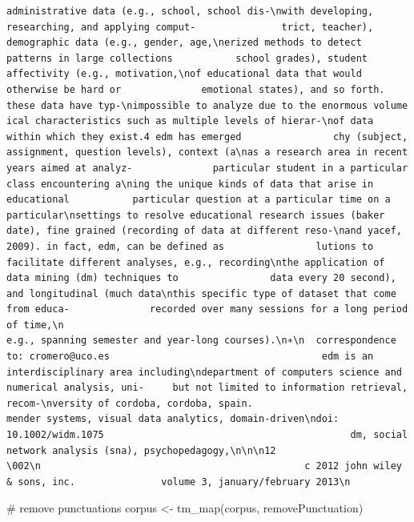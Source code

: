 \documentclass[
]{article}
\newenvironment{Shaded}{}{}
\newcommand{\CommentTok}[1]{\textcolor[rgb]{0.30,0.53,0.42}{#1}}
\newcommand{\FunctionTok}[1]{#1}
\newcommand{\NormalTok}[1]{#1}
\newcommand{\OtherTok}[1]{\textcolor[rgb]{1.00,0.25,0.00}{#1}}
\begin{document}
\begin{verbatim}
administrative data (e.g., school, school dis-\nwith developing, researching, and applying comput-               trict, teacher), demographic data (e.g., gender, age,\nerized methods to detect patterns in large collections           school grades), student affectivity (e.g., motivation,\nof educational data that would otherwise be hard or              emotional states), and so forth. these data have typ-\nimpossible to analyze due to the enormous volume                 ical characteristics such as multiple levels of hierar-\nof data within which they exist.4 edm has emerged                chy (subject, assignment, question levels), context (a\nas a research area in recent years aimed at analyz-              particular student in a particular class encountering a\ning the unique kinds of data that arise in educational           particular question at a particular time on a particular\nsettings to resolve educational research issues (baker           date), fine grained (recording of data at different reso-\nand yacef, 2009). in fact, edm, can be defined as                lutions to facilitate different analyses, e.g., recording\nthe application of data mining (dm) techniques to                data every 20 second), and longitudinal (much data\nthis specific type of dataset that come from educa-              recorded over many sessions for a long period of time,\n                                                                 e.g., spanning semester and year-long courses).\n∗\n  correspondence to: cromero@uco.es                                     edm is an interdisciplinary area including\ndepartment of computers science and numerical analysis, uni-     but not limited to information retrieval, recom-\nversity of cordoba, cordoba, spain.                              mender systems, visual data analytics, domain-driven\ndoi: 10.1002/widm.1075                                           dm, social network analysis (sna), psychopedagogy,\n\n\n12                                            \002\n                                              c 2012 john wiley & sons, inc.               volume 3, january/february 2013\n
\end{verbatim}

\begin{Shaded}
\begin{Highlighting}[]
\CommentTok{\# remove punctuations}
\NormalTok{corpus }\OtherTok{\textless{}{-}} \FunctionTok{tm\_map}\NormalTok{(corpus, removePunctuation)}
\end{Highlighting}
\end{Shaded}
\end{document}
